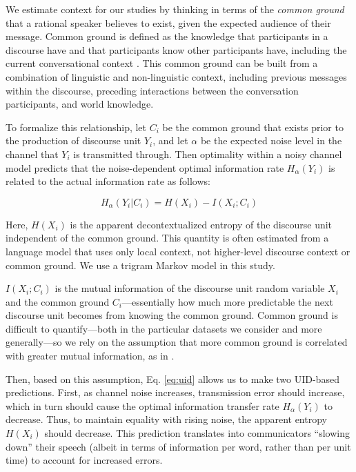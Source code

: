 \documentclass[11pt,letterpaper]{article}
\begin{document}
We estimate context for our studies by thinking in terms of the {\it common ground} that a rational speaker believes to exist, given the expected audience of their message. Common ground is defined as the knowledge that participants in a discourse have and that participants know other participants have, including the current conversational context \cite{clark1996}. This common ground can be built from a combination of linguistic and non-linguistic context, including previous messages within the discourse, preceding interactions between the conversation participants, and world knowledge. %

To formalize this relationship, let $C_i$ be the common ground that exists prior to the production of discourse unit $Y_i$, and let $\alpha$ be the expected noise level in the channel that $Y_i$ is transmitted through.  Then optimality within a noisy channel model predicts that the noise-dependent optimal information rate $H_{\alpha}(Y_i)$ is related to the actual information rate as follows:

\begin{equation}
H_{\alpha}(Y_i|C_i) =  H(X_i) - I(X_i ; C_i) \label{eq:uid}
\end{equation}

Here, $H(X_i)$ is the apparent decontextualized entropy of the discourse unit independent of the common ground.  This quantity is often estimated from a language model that uses only local context, not higher-level discourse context or common ground.  We use a trigram Markov model in this study.

$I(X_i;C_i)$ is the mutual information of the discourse unit random variable $X_i$ and the common ground $C_i$---essentially how much more predictable the next discourse unit becomes from knowing the common ground.  Common ground is difficult to quantify---both in the particular datasets we consider and more generally---so we rely on the assumption that more common ground is correlated with greater mutual information, as in .

Then, based on this assumption, Eq. \ref{eq:uid} allows us to make two UID-based predictions. First, as channel noise increases, transmission error should increase, which in turn should cause the optimal information transfer rate $H_\alpha(Y_i)$ to decrease.  Thus, to maintain equality with rising noise, the apparent entropy $H(X_i)$ should decrease. This prediction translates into communicators ``slowing down'' their speech (albeit in terms of information per word, rather than per unit time) to account for increased errors. 
\end{document}
